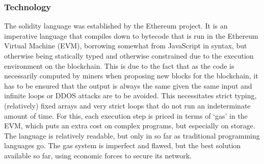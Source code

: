 \documentclass{article}
\begin{document}
\subsubsection{Technology}
The solidity language was established by the Ethereum project. \cite{gavinwoodEthereumSecureDecentralised} It is an imperative %
language that compiles down to bytecode that is run in the Ethereum Virtual Machine (EVM), borrowing somewhat from JavaScript in syntax, but otherwise being statically typed and otherwise constrained due to the execution environment on the blockchain. This is due to the fact that as the code is necessarily computed by miners when proposing new blocks for the blockchain, it has to be ensured that the output is always the same given the same input and infinite loops or DDOS attacks are to be avoided.%
This necessitates strict typing, (relatively) fixed arrays  and very strict loops that do not run an indeterminate amount of time. For this, each execution step is priced in terms of ‘gas’ in the EVM, which puts an extra cost on complex programs, but especially on storage. The language is relatively readable, but only in so far as traditional programming languages go. The gas system is imperfect and flawed, but the best solution available so far, using economic forces to secure its network.
\end{document}
